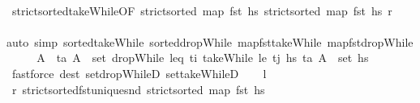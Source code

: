\begin{isabellebody}
\ \ \ \ \isamarkupfalse%
\ strict{\isacharunderscore}{\kern0pt}sorted{\isacharunderscore}{\kern0pt}takeWhile{\isacharbrackleft}{\kern0pt}OF\ {\isacartoucheopen}strict{\isacharunderscore}{\kern0pt}sorted\ {\isacharparenleft}{\kern0pt}map\ fst\ hs{\isacharparenright}{\kern0pt}{\isacartoucheclose}{\isacharbrackright}{\kern0pt}\ {\isacartoucheopen}strict{\isacharunderscore}{\kern0pt}sorted\ {\isacharparenleft}{\kern0pt}map\ fst\ hs{\isacharparenright}{\kern0pt}{\isacartoucheclose}\ {\isacartoucheopen}{\isacharquery}{\kern0pt}r{\isacartoucheclose}\isanewline
\ \ \ \ \isamarkupfalse%
{\isacharparenleft}{\kern0pt}auto\ simp{\isacharcolon}{\kern0pt}\ sorted{\isacharunderscore}{\kern0pt}takeWhile\ sorted{\isacharunderscore}{\kern0pt}dropWhile\ map{\isacharunderscore}{\kern0pt}fst{\isacharunderscore}{\kern0pt}takeWhile\ map{\isacharunderscore}{\kern0pt}fst{\isacharunderscore}{\kern0pt}dropWhile{\isacharparenright}{\kern0pt}\isanewline
\ \ \isamarkupfalse%
\ \isamarkupfalse%
\ A{\isacharprime}{\kern0pt}\ \ {\isachardoublequoteopen}{\isacharparenleft}{\kern0pt}t\isactrlsub a{\isacharcomma}{\kern0pt}\ A{\isacharprime}{\kern0pt}{\isacharparenright}{\kern0pt}\ {\isasymin}\ set\ {\isacharparenleft}{\kern0pt}{\isacharparenleft}{\kern0pt}dropWhile\ {\isacharparenleft}{\kern0pt}leq\ t\isactrlsub i{\isacharparenright}{\kern0pt}\ {\isacharparenleft}{\kern0pt}takeWhile\ {\isacharparenleft}{\kern0pt}le\ t\isactrlsub j{\isacharparenright}{\kern0pt}\ hs{\isacharparenright}{\kern0pt}{\isacharparenright}{\kern0pt}{\isacharparenright}{\kern0pt}{\isachardoublequoteclose}\ {\isachardoublequoteopen}{\isacharparenleft}{\kern0pt}t\isactrlsub a{\isacharcomma}{\kern0pt}\ A{\isacharprime}{\kern0pt}{\isacharparenright}{\kern0pt}\ {\isasymin}\ set\ hs{\isachardoublequoteclose}\isanewline
\ \ \ \ \isamarkupfalse%
\ {\isacharparenleft}{\kern0pt}fastforce\ dest{\isacharcolon}{\kern0pt}\ set{\isacharunderscore}{\kern0pt}dropWhileD\ set{\isacharunderscore}{\kern0pt}takeWhileD{\isacharparenright}{\kern0pt}\isanewline
\ \ \isamarkupfalse%
\ {\isacharquery}{\kern0pt}l\isanewline
\ \ \ \ \isamarkupfalse%
\ {\isacartoucheopen}{\isacharquery}{\kern0pt}r{\isacartoucheclose}\ strict{\isacharunderscore}{\kern0pt}sorted{\isacharunderscore}{\kern0pt}fst{\isacharunderscore}{\kern0pt}unique{\isacharunderscore}{\kern0pt}snd\ {\isacartoucheopen}strict{\isacharunderscore}{\kern0pt}sorted\ {\isacharparenleft}{\kern0pt}map\ fst\ hs{\isacharparenright}{\kern0pt}{\isacartoucheclose}\isanewline

\end{isabellebody}
